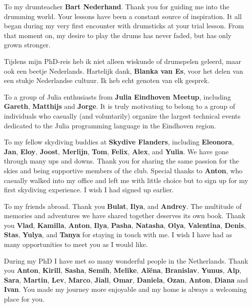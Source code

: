 To my drumteacher \textbf{Bart Nederhand}. Thank you for guiding me into the drumming world. 
Your lessons have been a constant source of inspiration.
It all began during my very first encounter with drumsticks at your trial lesson. 
From that moment on, my desire to play the drums has never faded, but has only grown stronger. 

Tijdens mijn PhD-reis heb ik niet alleen wiskunde of drumspelen geleerd, maar ook een beetje Nederlands. 
Hartelijk dank, \textbf{Blanka van Es}, voor het delen van een stukje Nederlandse cultuur. 
Ik heb echt genoten van elk gesprek.

To a group of Julia enthusiasts from \textbf{Julia Eindhoven Meetup}, including \textbf{Gareth}, \textbf{Matthijs} and \textbf{Jorge}.
It is truly motivating to belong to a group of individuals who casually (and voluntarily) organize the largest technical events dedicated to the Julia programming language in the Eindhoven region.

To my fellow skydiving buddies at \textbf{Skydive Flanders}, including \textbf{Eleonora}, \textbf{Jan}, \textbf{Eloy}, \textbf{Joost}, \textbf{Merlijn}, \textbf{Tom}, \textbf{Felix}, \textbf{Alex}, and \textbf{Yulia}. We have gone through many ups and downs. Thank you for sharing the same passion for the skies and being supportive members of the club. 
Special thanks to \textbf{Anton}, who casually walked into my office and left me with little choice but to sign up for my first skydiving experience. I wish I had signed up earlier.

To my friends abroad. 
Thank you \textbf{Bulat}, \textbf{Ilya}, and \textbf{Andrey}. The multitude of memories and adventures we have shared together deserves its own book. Thank you \textbf{Vlad}, \textbf{Kamilla}, \textbf{Anton}, \textbf{Ilya}, \textbf{Pasha}, \textbf{Natasha}, \textbf{Olya}, \textbf{Valentina}, \textbf{Denis}, \textbf{Stas}, \textbf{Yulya}, and \textbf{Tanya} for staying in touch with me. 
I wish I have had as many opportunities to meet you as I would like.

During my PhD I have met so many wonderful people in the Netherlands. Thank you \textbf{Anton}, \textbf{Kirill}, \textbf{Sasha}, \textbf{Semih}, \textbf{Melike}, \textbf{Alëna}, \textbf{Branislav}, \textbf{Yunus}, \textbf{Alp}, \textbf{Sara}, \textbf{Martin}, \textbf{Lev}, \textbf{Marco}, \textbf{Jiali}, \textbf{Omar}, \textbf{Daniela}, \textbf{Ozan}, \textbf{Anton}, \textbf{Diana} and \textbf{Ivan}. You made my journey more enjoyable and my home is always a welcoming place for you.

